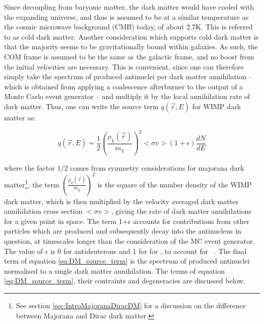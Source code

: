 Since decoupling from baryonic matter, the dark matter would have cooled with the expanding universe, and thus is assumed to be at a similar temperature as the cosmic microwave background (CMB) today, of about 2.7K\cite{}. This is referred to as cold dark matter. Another consideration which supports cold dark matter is that the majority seems to be gravitationally bound within galaxies\cite{}. As such, the COM frame is assumed to be the same as the galactic frame, and no boost from the initial velocities are necessary. This is convenient, since one can therefore simply take the spectrum of produced antinuclei per dark matter annihilation -- which is obtained from applying a coalescence afterburner to the output of a Monte Carlo event generator -- and multiply it by the local annihilation rate of dark matter. Thus, one can write the source term $q(\vec{r}, E)$ for WIMP dark matter as: 

\begin{equation}\label{eq:DM_source_term}
    q(\vec{r}, E) = \frac{1}{2} \left( \frac{\rho_{\chi}(\vec{r})}{m_\chi}\right)^2 <\sigma v > (1+\epsilon) \frac{dN}{dE}
\end{equation}

where the factor $1/2$ comes from symmetry considerations for majorana dark matter\footnote{See section \ref{sec:IntroMajoranaDiracDM} for a discussion on the difference between Majorana and Dirac dark matter.}, the term $\left( \frac{\rho_{\chi}(\vec{r})}{m_\chi}\right)^2$ is the square of the number density of the WIMP dark matter, which is then multiplied by the velocity averaged dark matter annihilation cross section $<\sigma v>$, giving the rate of dark matter annihilations for a given point in space. The term 1+$\epsilon$ accounts for contributions from other particles which are produced and subsequently decay into the antinucleus in question, at timescales longer than the consideration of the MC event generator. The value of $\epsilon$ is 0 for antideuterons and 1 for for \ahe, to account for \atrit\ . The final term of equation \ref{eq:DM_source_term} is the spectrum of produced antinuclei normalised to a single dark matter annihilation. The terms of equation \ref{eq:DM_source_term}, their contraints and degeneracies are discussed below.\\

